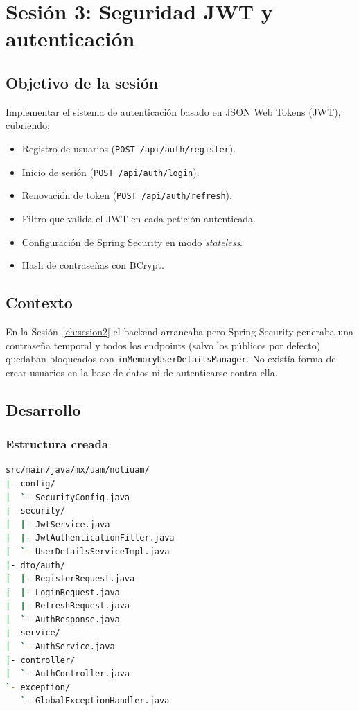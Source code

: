\chapter{Sesión 3: Seguridad JWT y autenticación}
\label{ch:sesion3}

\section{Objetivo de la sesión}

Implementar el sistema de autenticación basado en JSON Web Tokens (JWT), cubriendo:

\begin{itemize}[leftmargin=*]
  \item Registro de usuarios (\texttt{POST /api/auth/register}).
  \item Inicio de sesión (\texttt{POST /api/auth/login}).
  \item Renovación de token (\texttt{POST /api/auth/refresh}).
  \item Filtro que valida el JWT en cada petición autenticada.
  \item Configuración de Spring Security en modo \textit{stateless}.
  \item Hash de contraseñas con BCrypt.
\end{itemize}

\section{Contexto}

En la Sesión~\ref{ch:sesion2} el backend arrancaba pero Spring Security generaba una contraseña temporal y todos los endpoints (salvo los públicos por defecto) quedaban bloqueados con \texttt{inMemoryUserDetailsManager}. No existía forma de crear usuarios en la base de datos ni de autenticarse contra ella.

\section{Desarrollo}

\subsection{Estructura creada}

\begin{lstlisting}[language=bash]
src/main/java/mx/uam/notiuam/
|- config/
|  `- SecurityConfig.java
|- security/
|  |- JwtService.java
|  |- JwtAuthenticationFilter.java
|  `- UserDetailsServiceImpl.java
|- dto/auth/
|  |- RegisterRequest.java
|  |- LoginRequest.java
|  |- RefreshRequest.java
|  `- AuthResponse.java
|- service/
|  `- AuthService.java
|- controller/
|  `- AuthController.java
`- exception/
   `- GlobalExceptionHandler.java
\end{lstlisting}

